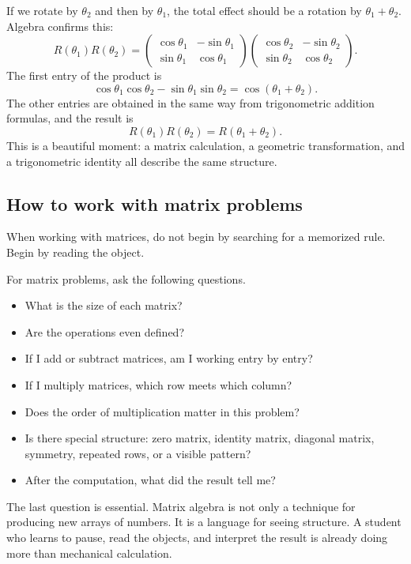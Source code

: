 If we rotate by \(\theta_2\) and then by \(\theta_1\), the total effect should be a rotation by \(\theta_1+\theta_2\). Algebra confirms this:
\[
R(\theta_1)R(\theta_2)=
\begin{pmatrix}
\cos\theta_1 & -\sin\theta_1\\
\sin\theta_1 & \cos\theta_1
\end{pmatrix}
\begin{pmatrix}
\cos\theta_2 & -\sin\theta_2\\
\sin\theta_2 & \cos\theta_2
\end{pmatrix}.
\]
The first entry of the product is
\[
\cos\theta_1\cos\theta_2-\sin\theta_1\sin\theta_2
=\cos(\theta_1+\theta_2).
\]
The other entries are obtained in the same way from trigonometric addition formulas, and the result is
\[
R(\theta_1)R(\theta_2)=R(\theta_1+\theta_2).
\]
This is a beautiful moment: a matrix calculation, a geometric transformation, and a trigonometric identity all describe the same structure.

\subsection{How to work with matrix problems}

When working with matrices, do not begin by searching for a memorized rule. Begin by reading the object.

\begin{summarybox}
For matrix problems, ask the following questions.
\begin{itemize}
\item What is the size of each matrix?
\item Are the operations even defined?
\item If I add or subtract matrices, am I working entry by entry?
\item If I multiply matrices, which row meets which column?
\item Does the order of multiplication matter in this problem?
\item Is there special structure: zero matrix, identity matrix, diagonal matrix, symmetry, repeated rows, or a visible pattern?
\item After the computation, what did the result tell me?
\end{itemize}
\end{summarybox}

The last question is essential. Matrix algebra is not only a technique for producing new arrays of numbers. It is a language for seeing structure. A student who learns to pause, read the objects, and interpret the result is already doing more than mechanical calculation.
